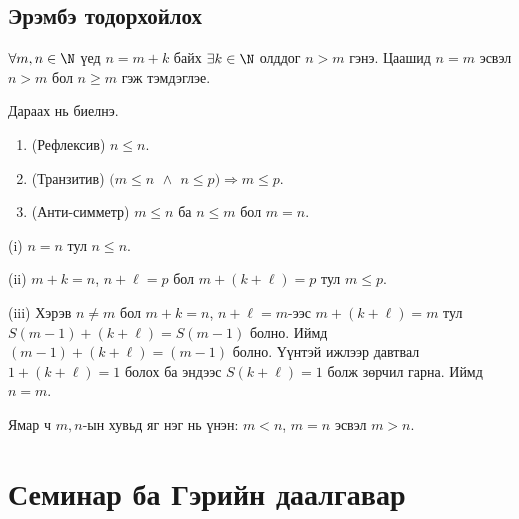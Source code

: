 \subsection{Эрэмбэ тодорхойлох}
\begin{definition}
$\forall m,n\in\N$ үед $n=m+k$ байх $\exists k\in\N$ олддог $n>m$ гэнэ. Цаашид $n=m$ эсвэл $n>m$ бол $n\ge m$ гэж тэмдэглэе.
\end{definition}
\begin{theorem}
Дараах нь биелнэ.
\begin{enumerate}\label{erembe}
  \item (Рефлексив) $n\le n$.
  \item (Транзитив) $\big(m\le n\ \,\wedge\,\ n\le p\big)\Rightarrow m\le p$.
  \item (Анти-симметр) $m\le n$ ба $n\le m$ бол $m=n$.
\end{enumerate}
\end{theorem}
\begin{prof}
(i) $n=n$ тул $n\le n$. 

(ii) $m+k=n$, $n+\ell=p$ бол $m+(k+\ell)=p$ тул $m\le p$. 

(iii) Хэрэв $n\neq m$ бол $m+k=n$, $n+\ell=m$-ээс $m+(k+\ell)=m$ тул $S(m-1)+(k+\ell)=S(m-1)$ болно. Иймд $(m-1)+(k+\ell)=(m-1)$ болно. Үүнтэй ижлээр давтвал $1+(k+\ell)=1$ болох ба эндээс $S(k+\ell)=1$ болж зөрчил гарна. Иймд $n=m$.
\end{prof}

\begin{theorem}[Трихотом]
Ямар ч $m,n$-ын хувьд яг нэг нь үнэн: $m<n$, $m=n$ эсвэл $m>n$.
\end{theorem}
\section{ Семинар ба Гэрийн даалгавар}
